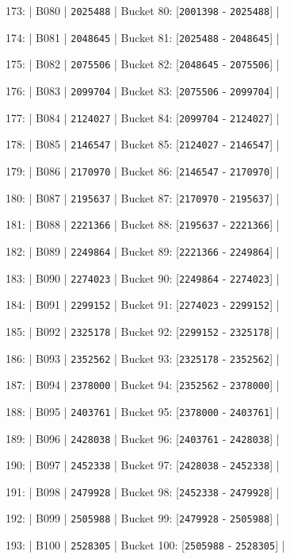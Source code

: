 \documentclass[11pt,a4paper]{article}
\begin{document}
{173: | B080 | \texttt{2025488} | Bucket 80: [\texttt{2001398} - \texttt{2025488}] |

174: | B081 | \texttt{2048645} | Bucket 81: [\texttt{2025488} - \texttt{2048645}] |

175: | B082 | \texttt{2075506} | Bucket 82: [\texttt{2048645} - \texttt{2075506}] |

176: | B083 | \texttt{2099704} | Bucket 83: [\texttt{2075506} - \texttt{2099704}] |

177: | B084 | \texttt{2124027} | Bucket 84: [\texttt{2099704} - \texttt{2124027}] |

178: | B085 | \texttt{2146547} | Bucket 85: [\texttt{2124027} - \texttt{2146547}] |

179: | B086 | \texttt{2170970} | Bucket 86: [\texttt{2146547} - \texttt{2170970}] |

180: | B087 | \texttt{2195637} | Bucket 87: [\texttt{2170970} - \texttt{2195637}] |

181: | B088 | \texttt{2221366} | Bucket 88: [\texttt{2195637} - \texttt{2221366}] |

182: | B089 | \texttt{2249864} | Bucket 89: [\texttt{2221366} - \texttt{2249864}] |

183: | B090 | \texttt{2274023} | Bucket 90: [\texttt{2249864} - \texttt{2274023}] |

184: | B091 | \texttt{2299152} | Bucket 91: [\texttt{2274023} - \texttt{2299152}] |

185: | B092 | \texttt{2325178} | Bucket 92: [\texttt{2299152} - \texttt{2325178}] |

186: | B093 | \texttt{2352562} | Bucket 93: [\texttt{2325178} - \texttt{2352562}] |

187: | B094 | \texttt{2378000} | Bucket 94: [\texttt{2352562} - \texttt{2378000}] |

188: | B095 | \texttt{2403761} | Bucket 95: [\texttt{2378000} - \texttt{2403761}] |

189: | B096 | \texttt{2428038} | Bucket 96: [\texttt{2403761} - \texttt{2428038}] |

190: | B097 | \texttt{2452338} | Bucket 97: [\texttt{2428038} - \texttt{2452338}] |

191: | B098 | \texttt{2479928} | Bucket 98: [\texttt{2452338} - \texttt{2479928}] |

192: | B099 | \texttt{2505988} | Bucket 99: [\texttt{2479928} - \texttt{2505988}] |

193: | B100 | \texttt{2528305} | Bucket 100: [\texttt{2505988} - \texttt{2528305}] |

}
\end{document}
